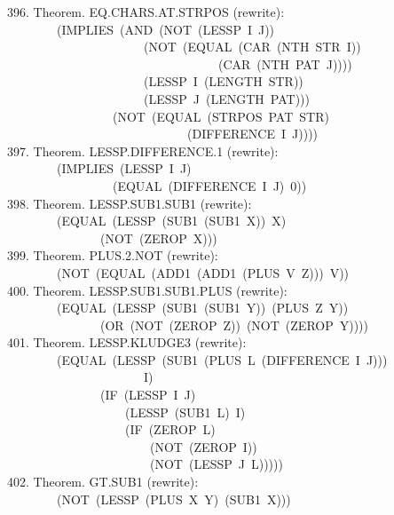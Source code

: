 \documentclass[10pt]{book}
\newenvironment{pubasis}{\begin{flushleft}}{\end{flushleft}}
\begin{document}
\begin{pubasis}
396.    Theorem.  EQ.CHARS.AT.STRPOS (rewrite):\\
~~~~~~~~(IMPLIES~(AND~(NOT~(LESSP~I~J))\\
~~~~~~~~~~~~~~~~~~~~~~(NOT~(EQUAL~(CAR~(NTH~STR~I))\\
~~~~~~~~~~~~~~~~~~~~~~~~~~~~~~~~~~(CAR~(NTH~PAT~J))))\\
~~~~~~~~~~~~~~~~~~~~~~(LESSP~I~(LENGTH~STR))\\
~~~~~~~~~~~~~~~~~~~~~~(LESSP~J~(LENGTH~PAT)))\\
~~~~~~~~~~~~~~~~~(NOT~(EQUAL~(STRPOS~PAT~STR)\\
~~~~~~~~~~~~~~~~~~~~~~~~~~~~~(DIFFERENCE~I~J))))\\

397.    Theorem.  LESSP.DIFFERENCE.1 (rewrite):\\
~~~~~~~~(IMPLIES~(LESSP~I~J)\\
~~~~~~~~~~~~~~~~~(EQUAL~(DIFFERENCE~I~J)~0))\\

398.    Theorem.  LESSP.SUB1.SUB1 (rewrite):\\
~~~~~~~~(EQUAL~(LESSP~(SUB1~(SUB1~X))~X)\\
~~~~~~~~~~~~~~~(NOT~(ZEROP~X)))\\

399.    Theorem.  PLUS.2.NOT (rewrite):\\
~~~~~~~~(NOT~(EQUAL~(ADD1~(ADD1~(PLUS~V~Z)))~V))\\

400.    Theorem.  LESSP.SUB1.SUB1.PLUS (rewrite):\\
~~~~~~~~(EQUAL~(LESSP~(SUB1~(SUB1~Y))~(PLUS~Z~Y))\\
~~~~~~~~~~~~~~~(OR~(NOT~(ZEROP~Z))~(NOT~(ZEROP~Y))))\\

401.    Theorem.  LESSP.KLUDGE3 (rewrite):\\
~~~~~~~~(EQUAL~(LESSP~(SUB1~(PLUS~L~(DIFFERENCE~I~J)))\\
~~~~~~~~~~~~~~~~~~~~~~I)\\
~~~~~~~~~~~~~~~(IF~(LESSP~I~J)\\
~~~~~~~~~~~~~~~~~~~(LESSP~(SUB1~L)~I)\\
~~~~~~~~~~~~~~~~~~~(IF~(ZEROP~L)\\
~~~~~~~~~~~~~~~~~~~~~~~(NOT~(ZEROP~I))\\
~~~~~~~~~~~~~~~~~~~~~~~(NOT~(LESSP~J~L)))))\\

402.    Theorem.  GT.SUB1 (rewrite):\\
~~~~~~~~(NOT~(LESSP~(PLUS~X~Y)~(SUB1~X)))\\


\end{pubasis}
\end{document}
